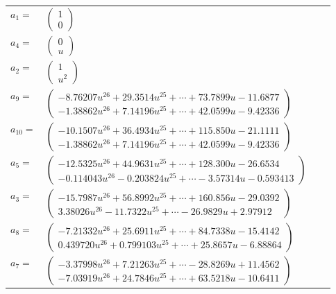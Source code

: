 \documentclass[1p]{elsarticle_modified}
\theoremstyle{definition}
\begin{document}
\begin{tabular}{m{7pt} m{180pt} m{7pt} m{180pt} }
\flushright $a_{1}=$&$\begin{pmatrix}1\\0\end{pmatrix}$ \\
\flushright $a_{4}=$&$\begin{pmatrix}0\\u\end{pmatrix}$ \\
\flushright $a_{2}=$&$\begin{pmatrix}1\\u^2\end{pmatrix}$ \\
\flushright $a_{9}=$&$\begin{pmatrix}-8.76207 u^{26}+29.3514 u^{25}+\cdots+73.7899 u-11.6877\\-1.38862 u^{26}+7.14196 u^{25}+\cdots+42.0599 u-9.42336\end{pmatrix}$ \\
\flushright $a_{10}=$&$\begin{pmatrix}-10.1507 u^{26}+36.4934 u^{25}+\cdots+115.850 u-21.1111\\-1.38862 u^{26}+7.14196 u^{25}+\cdots+42.0599 u-9.42336\end{pmatrix}$ \\
\flushright $a_{5}=$&$\begin{pmatrix}-12.5325 u^{26}+44.9631 u^{25}+\cdots+128.300 u-26.6534\\-0.114043 u^{26}-0.203824 u^{25}+\cdots-3.57314 u-0.593413\end{pmatrix}$ \\
\flushright $a_{3}=$&$\begin{pmatrix}-15.7987 u^{26}+56.8992 u^{25}+\cdots+160.856 u-29.0392\\3.38026 u^{26}-11.7322 u^{25}+\cdots-26.9829 u+2.97912\end{pmatrix}$ \\
\flushright $a_{8}=$&$\begin{pmatrix}-7.21332 u^{26}+25.6911 u^{25}+\cdots+84.7338 u-15.4142\\0.439720 u^{26}+0.799103 u^{25}+\cdots+25.8657 u-6.88864\end{pmatrix}$ \\
\flushright $a_{7}=$&$\begin{pmatrix}-3.37998 u^{26}+7.21263 u^{25}+\cdots-28.8269 u+11.4562\\-7.03919 u^{26}+24.7846 u^{25}+\cdots+63.5218 u-10.6411\end{pmatrix}$ \\

\end{tabular}
\end{document}
